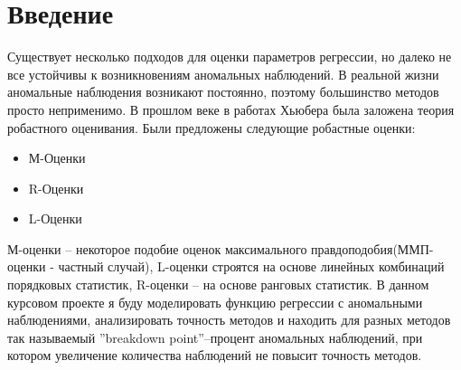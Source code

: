 \documentclass[12pt]{article}
\begin{document}
\section{Введение}
Существует несколько подходов для оценки параметров регрессии, но далеко не все устойчивы к возникновениям аномальных наблюдений.
В реальной жизни аномальные наблюдения возникают постоянно, поэтому большинство методов просто неприменимо.
В прошлом веке в работах Хьюбера была заложена теория робастного оценивания.\hfill\break
Были предложены следующие робастные оценки\cite{Huber}:\hfill\break
\begin{itemize}
    \item М-Оценки\\
    \item R-Оценки\\
    \item L-Оценки
\end{itemize}
М-оценки -- некоторое подобие оценок максимального правдоподобия(ММП-оценки - частный случай), L-оценки строятся на основе линейных комбинаций порядковых статистик, R-оценки -- на основе ранговых статистик.
В данном курсовом проекте я буду моделировать функцию регрессии с аномальными наблюдениями, анализировать точность методов и находить для разных методов так называемый ''breakdown point''--процент аномальных наблюдений, при котором увеличение количества наблюдений не повысит точность методов.
\end{document}
